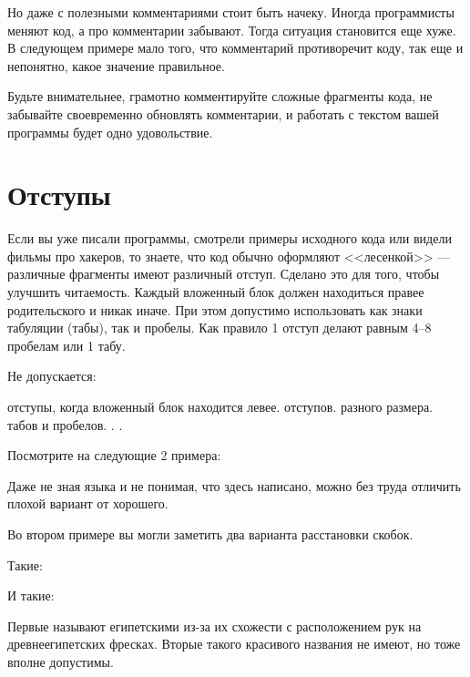 \documentclass[book.tex]{subfiles}
\begin{document}
Но даже с полезными комментариями стоит быть начеку. Иногда программисты меняют код, а про комментарии забывают. Тогда ситуация становится еще хуже. В следующем примере мало того, что комментарий противоречит коду, так еще и непонятно, какое значение правильное.


Будьте внимательнее, грамотно комментируйте сложные фрагменты кода, не забывайте своевременно обновлять комментарии, и работать с текстом вашей программы будет одно удовольствие.

\section*{Отступы}

Если вы уже писали программы, смотрели примеры исходного кода или видели фильмы про хакеров, то знаете, что код обычно оформляют <<лесенкой>> --- различные фрагменты имеют различный отступ. Сделано это для того, чтобы улучшить читаемость. Каждый вложенный блок должен находиться правее родительского и никак иначе. При этом допустимо использовать как знаки табуляции (табы), так и пробелы. Как правило 1 отступ делают равным 4--8 пробелам или 1 табу.

Не допускается:
\begin{itemize}
 отступы, когда вложенный блок находится левее.
 отступов.
 разного размера.
 табов и пробелов.
.
.
\end{itemize}

Посмотрите на следующие 2 примера:



Даже не зная языка и не понимая, что здесь написано, можно без труда отличить плохой вариант от хорошего.

Во втором примере вы могли заметить два варианта расстановки скобок.

Такие:


И такие:


Первые называют египетскими из-за их схожести с расположением рук на древнеегипетских фресках. Вторые такого красивого названия не имеют, но тоже вполне допустимы.
\end{document}
